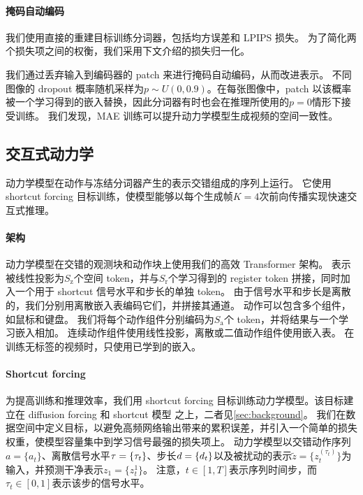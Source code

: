 \documentclass[11pt]{article}
\begin{document}
\paragraph{掩码自动编码}

我们使用直接的重建目标训练分词器，包括均方误差和 LPIPS\citep{lpips} 损失。
为了简化两个损失项之间的权衡，我们采用下文介绍的损失归一化。


我们通过丢弃输入到编码器的 patch 来进行掩码自动编码，从而改进表示\citep{mae,chen2025maetok}。
不同图像的 dropout 概率随机采样为$p \sim U(0, 0.9)$。在每张图像中，patch 以该概率被一个学习得到的嵌入替换，因此分词器有时也会在推理所使用的$p=0$情形下接受训练。
我们发现，MAE 训练可以提升动力学模型生成视频的空间一致性。

\subsection{交互式动力学}
\label{sec:dynamics}

动力学模型在动作与冻结分词器产生的表示交错组成的序列上运行。
它使用 shortcut forcing 目标训练，使模型能够以每个生成帧$K=4$次前向传播实现快速交互式推理。

\paragraph{架构}

动力学模型在交错的观测块和动作块上使用我们的高效 Transformer 架构。
表示被线性投影为$S_\mathrm{z}$个空间 token，并与$S_\mathrm{r}$个学习得到的 register token\citep{vitregister} 拼接，同时加入一个用于 shortcut 信号水平和步长的单独 token。
由于信号水平和步长是离散的，我们分别用离散嵌入表编码它们，并拼接其通道。
动作可以包含多个组件，如鼠标和键盘。
我们将每个动作组件分别编码为$S_\mathrm{a}$个 token，并将结果与一个学习嵌入相加。
连续动作组件使用线性投影，离散或二值动作组件使用嵌入表。
在训练无标签的视频时，只使用已学到的嵌入。

\paragraph{Shortcut forcing}

为提高训练和推理效率，我们用 shortcut forcing 目标训练动力学模型。该目标建立在 diffusion forcing\citep{diffusionforcing} 和 shortcut 模型\citep{shortcut} 之上，二者见\cref{sec:background}。
我们在数据空间中定义目标，以避免高频网络输出带来的累积误差，并引入一个简单的损失权重，使模型容量集中到学习信号最强的损失项上。
动力学模型以交错动作序列$a=\{a_t\}$、离散信号水平$\tau=\{\tau_t\}$、步长$d=\{d_t\}$以及被扰动的表示$\tilde{z}=\{z_t^{(\tau_t)}\}$为输入，并预测干净表示$z_1=\{z_t^1\}$。
注意，$t \in [1,T]$表示序列时间步，而$\tau_t \in [0, 1]$表示该步的信号水平。
\end{document}
